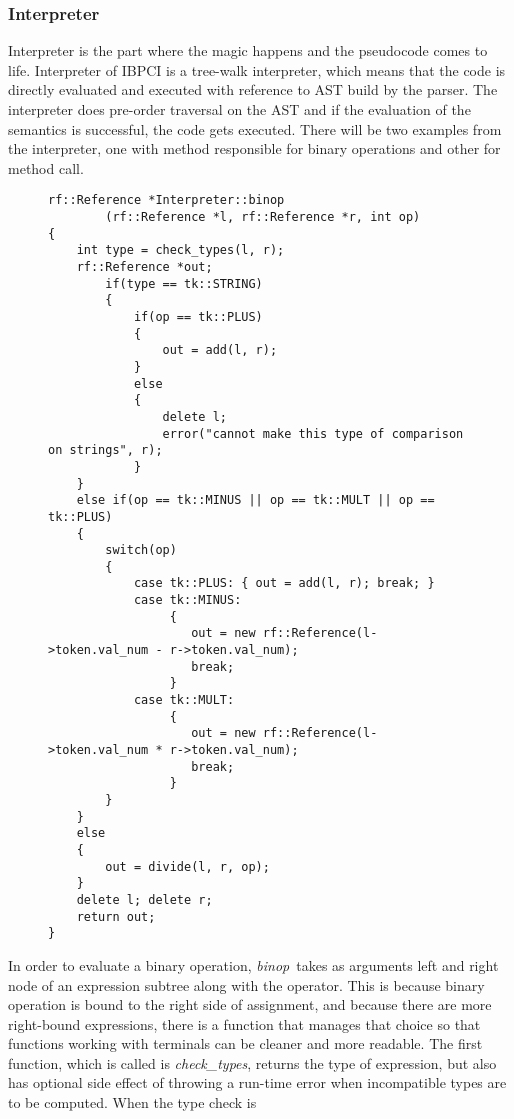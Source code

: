 \documentclass[12pt]{article}
\begin{document}
\subsubsection*{Interpreter}
Interpreter is the part where the magic happens and the pseudocode comes to life. Interpreter of IBPCI is 
a tree-walk interpreter, which means that the code is directly evaluated and executed with reference to 
AST build by the parser. The interpreter does pre-order traversal on the AST and if the evaluation of the semantics is 
successful, the code gets executed. There will be two examples from the interpreter, one with method responsible for 
binary operations and other for method call.
\begin{figure}[H]
    \caption{}
    \label{snip_1}
    \begin{verbatim}
rf::Reference *Interpreter::binop
        (rf::Reference *l, rf::Reference *r, int op)
{
    int type = check_types(l, r);
    rf::Reference *out;
        if(type == tk::STRING)
        {
            if(op == tk::PLUS)
            { 
                out = add(l, r);
            }
            else
            { 
                delete l;
                error("cannot make this type of comparison on strings", r);
            }
    }
    else if(op == tk::MINUS || op == tk::MULT || op == tk::PLUS)
    {
        switch(op)
        {
            case tk::PLUS: { out = add(l, r); break; }
            case tk::MINUS:
                 {
                    out = new rf::Reference(l->token.val_num - r->token.val_num); 
                    break;
                 }
            case tk::MULT: 
                 {
                    out = new rf::Reference(l->token.val_num * r->token.val_num); 
                    break;
                 }
        }
    }
    else
    {
        out = divide(l, r, op);
    }
    delete l; delete r;
    return out;
}
    \end{verbatim}
\end{figure}
In order to evaluate a binary operation, \emph{binop} takes as arguments left and right node of an expression subtree along
with the operator. This is because binary operation is bound to the right side of assignment, and because there are more
right-bound expressions, there is a function that manages that choice so that functions working with terminals can be 
cleaner and more readable. The first function, which is called is \emph{check\_types}, returns the type of expression, but
also has optional side effect of throwing a run-time error when incompatible types are to be computed. When the type check is 
\end{document}
